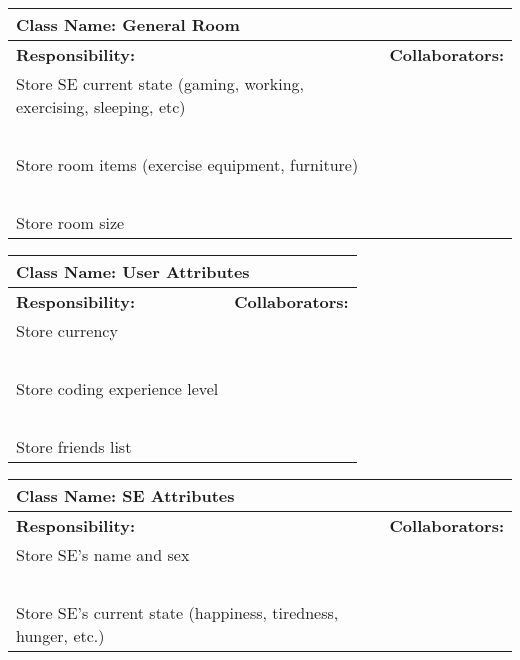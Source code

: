 \documentclass[]{article}
\begin{document}
\begin{table}[H]
    \centering
    \begin{tabular}{|p{5cm}|p{5cm}|}
        \hline
        \multicolumn{2}{|l|}{\textbf{Class Name:} General Room}\\
        \hline
        \textbf{Responsibility:} & \textbf{Collaborators:}\\
        \hline
        Store SE current state (gaming, working, exercising, sleeping, etc) & ~\\
        ~ & ~\\
        Store room items (exercise equipment, furniture) & ~\\
        ~ & ~\\
        Store room size & ~\\
        \hline
    \end{tabular}
\end{table}

\begin{table}[H]
    \centering
    \begin{tabular}{|p{5cm}|p{5cm}|}
        \hline
        \multicolumn{2}{|l|}{\textbf{Class Name:} User Attributes}\\
        \hline
        \textbf{Responsibility:} & \textbf{Collaborators:}\\
        \hline
        Store currency & ~\\
        ~ & ~\\
        Store coding experience level & ~\\
        ~ & ~\\
        Store friends list & ~\\
        \hline
    \end{tabular}
\end{table}

\begin{table}[H]
    \centering
    \begin{tabular}{|p{5cm}|p{5cm}|}
        \hline
        \multicolumn{2}{|l|}{\textbf{Class Name:} SE Attributes}\\
        \hline
        \textbf{Responsibility:} & \textbf{Collaborators:}\\
        \hline
        Store SE’s name and sex & ~\\
        ~ & ~\\
        Store SE’s current state (happiness, tiredness, hunger, etc.) & ~\\
        \hline
    \end{tabular}
\end{table}
\end{document}
